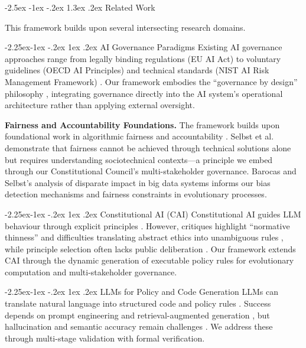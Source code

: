 \documentclass[manuscript,screen,review,anonymous,9pt]{acmart}
\makeatletter
\renewcommand\section{\@startsection{section}{1}{\z@}%
  {-2.5ex \@plus -1ex \@minus -.2ex}%
  {1.3ex \@plus.2ex}%
  {\normalfont\Large\bfseries}}
\renewcommand\subsection{\@startsection{subsection}{2}{\z@}%
  {-2.25ex\@plus -1ex \@minus -.2ex}%
  {1ex \@plus .2ex}%
  {\normalfont\large\bfseries}}
\makeatother
\begin{document}
\section{Related Work}
\label{sec:related_work}

This framework builds upon several intersecting research domains.

\subsection{AI Governance Paradigms}
Existing AI governance approaches range from legally binding regulations (EU AI Act) to voluntary guidelines (OECD AI Principles) and technical standards (NIST AI Risk Management Framework) \cite{Wynants2025ETHICAL, WorldBank2024AIGovernance, CambridgeUP2024CorporateGovernance}. Our framework embodies the ``governance by design'' philosophy \cite{Engin2025AdaptiveAIGovernance}, integrating governance directly into the AI system's operational architecture rather than applying external oversight.

\textbf{Fairness and Accountability Foundations.} The framework builds upon foundational work in algorithmic fairness and accountability \cite{Selbst2019FairnessAccountability, Barocas2016BigDataDisparate}. Selbst et al. demonstrate that fairness cannot be achieved through technical solutions alone but requires understanding sociotechnical contexts---a principle we embed through our Constitutional Council's multi-stakeholder governance. Barocas and Selbst's analysis of disparate impact in big data systems informs our bias detection mechanisms and fairness constraints in evolutionary processes.

\subsection{Constitutional AI (CAI)}
Constitutional AI guides LLM behaviour through explicit principles \cite{Bai2025ConstitutionalAI}. However, critiques highlight ``normative thinness'' and difficulties translating abstract ethics into unambiguous rules \cite{DigiCon2025ConstitutionalAIThin, ChaconMenke2025CAISmallLLMs}, while principle selection often lacks public deliberation \cite{Hwang2025PublicCAI}. Our framework extends CAI through the dynamic generation of executable policy rules for evolutionary computation and multi-stakeholder governance.

\subsection{LLMs for Policy and Code Generation}
LLMs can translate natural language into structured code and policy rules \cite{Almulla2024EmergenceLLMPolicy, ResearchGate2025AutoPAC, Li2025VeriCoder}. Success depends on prompt engineering and retrieval-augmented generation \cite{AnalyticsVidhya2024PromptingTechniques, arXiv2025FutureWorkRAG}, but hallucination and semantic accuracy remain challenges \cite{AAAI2025CodeHalu, Taeihagh2025Governing}. We address these through multi-stage validation with formal verification.
\end{document}
